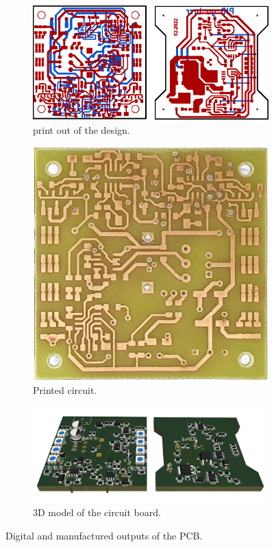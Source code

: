 \documentclass[conference]{IEEEtran}
\begin{document}
\begin{figure}[!tbp]
  \begin{subfigure}[b]{0.319\textwidth}
    \includegraphics[width=\textwidth]{figures/pcb.eps}
    \caption{print out of the design.}
    \label{PCB}
  \end{subfigure}
  \hfill
  \begin{subfigure}[b]{0.158\textwidth}
    \includegraphics[width=\textwidth]{figures/pcb.png}
    \caption{Printed circuit.}
    \label{}
  \end{subfigure}
  \begin{subfigure}{0.5\textwidth}
    \includegraphics[width=\textwidth]{figures/pcki.png}
    \caption{3D model of the circuit board.}
  \end{subfigure}
  \caption{Digital and manufactured outputs of the PCB.}
\end{figure}
\end{document}
